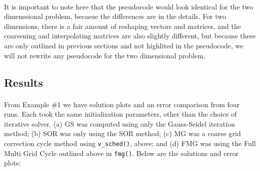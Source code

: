 \documentclass[pdftex,12pt,a4paper]{article}
\begin{document}
        \paragraph*{} It is important to note here that the pseudocode would look identical for the two dimenssional problem, becasue the differences are in the details. For two dimensions, there is a fair amount of reshaping vectors and matrices, and the coarsening and interpolating matrices are also slightly different, but because these are only outlined in previous sections and not highlited in the pseudocode, we will not rewrite any pseudocode for the two dimensional problem. 

    \subsection{Results}

        \paragraph*{} From Example \#1 we have solution plots and an error comparison from four runs. Each took the same initialization parameters, other than the choice of iterative solver. (a) GS was computed using only the Gauss-Seidel iteration method; (b) SOR was only using the SOR method; (c) MG was a coarse grid correction cycle method using \lstinline{v_sched()}, above; and (d) FMG was using the Full Multi Grid Cycle outlined above in \lstinline{fmg()}. Below are the solutions and error plots:
\end{document}
